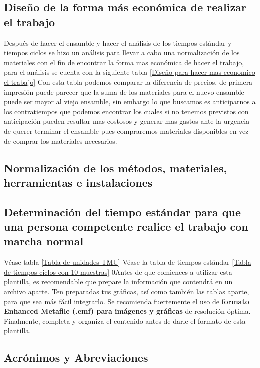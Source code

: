     \subsection{Diseño de la forma más económica de realizar el trabajo}
    Después de hacer el ensamble y hacer el análisis de los tiempos estándar y tiempos ciclos se hizo un análisis para llevar a cabo una normalización de los materiales con el fin de encontrar la forma mas económica de hacer el trabajo, para el análisis se cuenta con la siguiente tabla \ref{Diseño para hacer mas economico el trabajo}
    Con esta tabla podemos comparar la diferencia de precios, de primera impresión puede parecer que la suma de los materiales para el nuevo ensamble puede ser mayor al viejo ensamble, sin embargo lo que buscamos es anticiparnos a los contratiempos que podemos encontrar los cuales si no tenemos previstos con anticipación pueden resultar mas costosos y generar mas gastos ante la urgencia de querer terminar el ensamble pues compraremos materiales disponibles en vez de comprar los materiales necesarios.
    
    \subsection{Normalización de los métodos, materiales, herramientas e instalaciones}
    
    \subsection{Determinación del tiempo estándar para que una persona competente realice el trabajo con marcha normal}
    Véase tabla \ref{Tabla de unidades TMU}
    Véase la tabla de tiempos estándar \ref{Tabla de tiempos ciclos con 10 muestras}
    0Antes de que comiences a utilizar esta plantilla, es recomendable que prepare la información que contendrá en un archivo aparte. 
    Ten preparadas tus gráficas, así como también las tablas aparte, para que sea más fácil integrarlo. 
    Se recomienda fuertemente el uso de \textbf{formato Enhanced Metafile (.emf) para imágenes y gráficas} de resolución óptima. 
    Finalmente, completa y organiza el contenido antes de darle el formato de esta plantilla. 
    
    \subsection{Acrónimos y Abreviaciones}
    
